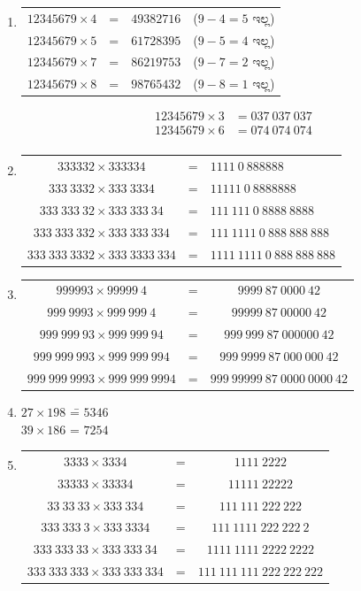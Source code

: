 \begin{enumerate}
\item 
\begin{tabular}[t]{l@{\;}l@{\;}ll}
$12345679\times 4$ & = & $49382716$ & ($9-4 = 5$ ಇಲ್ಲ)\\
$12345679\times 5$ & = & $61728395$ & ($9-5 = 4$ ಇಲ್ಲ)\\
$12345679\times 7$ & = & $86219753$ & ($9-7 = 2$ ಇಲ್ಲ)\\
$12345679\times 8$ & = & $98765432$ & ($9-8 = 1$ ಇಲ್ಲ)
\end{tabular}
\begin{align*}
12345679\times 3 & = 037~037~037\\
12345679\times 6 & = 074~074~074\\ 
\end{align*}

\item 
\begin{tabular}[t]{c@{\;}c@{\;}l}
$333332\times 333334$ & = & $1111~0~888888$\\
$333~3332\times 333~3334$ & = & $11111~0~8888888$\\
$333~333~32\times 333~333~34$ & = & $111~111~0~8888~8888$\\
$333~333~332\times 333~333~334$ & = & $111~1111~0~888~888~888$\\
$333~333~3332\times 333~3333~334$ & = & $1111~1111~0~888~888~888$\\
\end{tabular}

\item 
\begin{tabular}[t]{c@{\;}c@{\;}c}
$999993\times 99999~4$ & = & $9999~87~0000~42$\\
$999~9993\times 999~999~4$ & = & $99999~87~00000~42$\\
$999~999~93\times 999~999~94$ & = & $999~999~87~000000~42$\\
$999~999~993\times 999~999~994$ & = & $999~9999~87~000~000~42$\\
$999~999~9993\times 999~999~9994$ & = & $999~99999~87~0000~0000~42$
\end{tabular}

\item 
\begin{tabbing}
$27\times 198$ \= = $5346$\\
$39\times 186$ \> = $7254$
\end{tabbing}

\item 
\begin{tabular}[t]{c@{\;}c@{\;}c}
$3333\times 3334$ & = & $1111~2222$\\
$33333\times 33334$ & = & $11111~22222$\\
$33~33~33\times 333~334$ & = & $111~111~222~222$\\
$333~333~3\times 333~3334$ & = & $111~1111~222~222~2$\\
$333~333~33\times 333~333~34$ & = & $1111~1111~2222~2222$\\
$333~333~333\times 333~333~334$ & = & $111~111~111~222~222~222$\\
\end{tabular}


\end{enumerate}
